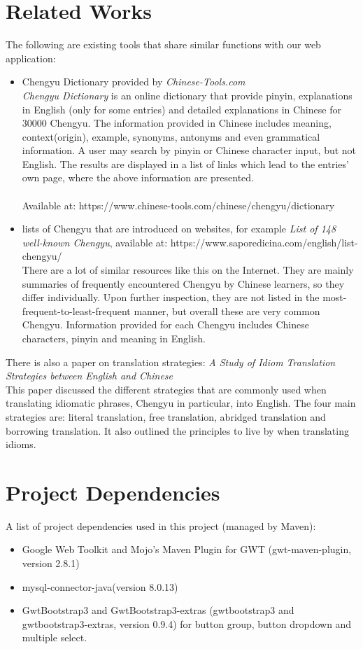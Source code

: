 \documentclass[11pt]{article} %
\begin{document}
\section{Related Works}
The following are existing tools that share similar functions with our web application:
\begin{itemize}
\item Chengyu Dictionary provided by \textit{Chinese-Tools.com}\\
\textit{Chengyu Dictionary} is an online dictionary that provide pinyin, explanations in English (only for some entries) and detailed explanations in Chinese for 30000 Chengyu. The information provided in Chinese includes meaning, context(origin), example, synonyms, antonyms and even grammatical information. A user may search by pinyin or Chinese character input, but not English. The results are displayed in a list of links which lead to the entries' own page, where the above information are presented.\\
\\
Available at: https://www.chinese-tools.com/chinese/chengyu/dictionary\\
\item lists of Chengyu that are introduced on websites, for example \textit{List of 148 well-known Chengyu}, available at: https://www.saporedicina.com/english/list-chengyu/\\
There are a lot of similar resources like this on the Internet. They are mainly summaries of frequently encountered Chengyu by Chinese learners, so they differ individually. Upon further inspection, they are not listed in the most-frequent-to-least-frequent manner, but overall these are very common Chengyu. Information provided for each Chengyu includes Chinese characters, pinyin and meaning in English.\\
\end{itemize}
There is also a paper on translation strategies: \textit{A Study of Idiom Translation Strategies between English and Chinese}\\
This paper discussed the different strategies that are commonly used when translating idiomatic phrases, Chengyu in particular, into English. The four main strategies are: literal translation, free translation, abridged translation and borrowing translation. It also outlined the principles to live by when translating idioms.


\section{Project Dependencies}
A list of project dependencies used in this project (managed by Maven):
\begin{itemize}
\item Google Web Toolkit and Mojo's Maven Plugin for GWT  (gwt-maven-plugin, version 2.8.1)
\item mysql-connector-java(version 8.0.13)
\item GwtBootstrap3 and GwtBootstrap3-extras (gwtbootstrap3 and gwtbootstrap3-extras, version 0.9.4) for button group, button dropdown and multiple select.
\end{itemize}
\end{document}
